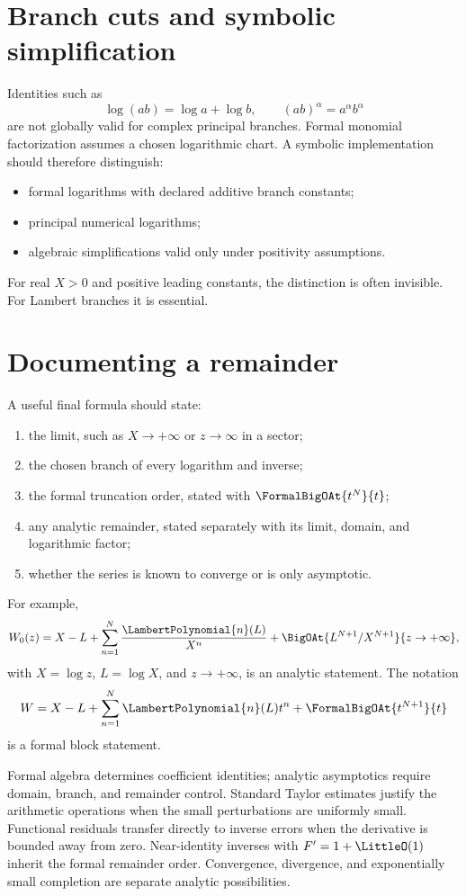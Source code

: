 \documentclass[11pt,openany]{book}
\theoremstyle{definition}
\theoremstyle{plain}
\theoremstyle{remark}
\begin{document}
\section{Branch cuts and symbolic simplification}
Identities such as
\[
 \log(ab)=\log a+\log b,
 \qquad
 (ab)^\alpha=a^\alpha b^\alpha
\]
are not globally valid for complex principal branches.  Formal monomial
factorization assumes a chosen logarithmic chart.  A symbolic implementation
should therefore distinguish:
\begin{itemize}
\item formal logarithms with declared additive branch constants;
\item principal numerical logarithms;
\item algebraic simplifications valid only under positivity assumptions.
\end{itemize}
For real \(X>0\) and positive leading constants, the distinction is often
invisible.  For Lambert branches it is essential.

\section{Documenting a remainder}
A useful final formula should state:
\begin{enumerate}
\item the limit, such as \(X\to+\infty\) or \(z\to\infty\) in a sector;
\item the chosen branch of every logarithm and inverse;
\item the formal truncation order, stated with \(\FormalBigOAt{t^N}{t}\);
\item any analytic remainder, stated separately with its limit, domain, and
      logarithmic factor;
\item whether the series is known to converge or is only asymptotic.
\end{enumerate}
For example,
\[
 W_0(z)=X-L+\sum_{n=1}^N\frac{\LambertPolynomial{n}(L)}{X^n}
 +\BigOAt{L^{N+1}/X^{N+1}}{z\to+\infty},
\]
with \(X=\log z\), \(L=\log X\), and \(z\to+\infty\), is an analytic
statement.  The notation
\[
 W=X-L+\sum_{n=1}^N\LambertPolynomial{n}(L)t^n+\FormalBigOAt{t^{N+1}}{t}
\]
is a formal block statement.

\begin{summarybox}
Formal algebra determines coefficient identities; analytic asymptotics require
domain, branch, and remainder control.  Standard Taylor estimates justify the
arithmetic operations when the small perturbations are uniformly small.
Functional residuals transfer directly to inverse errors when the derivative
is bounded away from zero.  Near-identity inverses with \(F'=1+\LittleO(1)\) inherit
the formal remainder order.  Convergence, divergence, and exponentially small
completion are separate analytic possibilities.
\end{summarybox}
\end{document}
